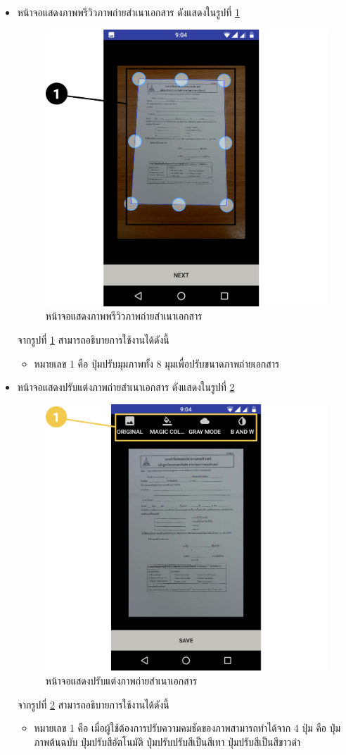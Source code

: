 \begin{enumerate}
\begin{itemize}
			\item หน้าจอแสดงภาพพรีวิวภาพถ่ายสำเนาเอกสาร ดังแสดงในรูปที่ \ref{Fig:submit2}
			\begin{figure}[H]
				\centering
				\includegraphics[width=0.5\columnwidth]{Figures/7/Manual/submit2}
				\caption{หน้าจอแสดงภาพพรีวิวภาพถ่ายสำเนาเอกสาร}
				\label{Fig:submit2}
			\end{figure}
			จากรูปที่ \ref{Fig:submit2} สามารถอธิบายการใช้งานได้ดังนี้
			\begin{itemize}[label={--}]
				\item หมายเลข 1 คือ ปุ่มปรับมุมภาพทั้ง 8 มุมเพื่อปรับขนาดภาพถ่ายเอกสาร
			\end{itemize}
			
			\item หน้าจอแสดงปรับแต่งภาพถ่ายสำเนาเอกสาร ดังแสดงในรูปที่ \ref{Fig:submit3}
			\begin{figure}[H]
				\centering
				\includegraphics[width=0.5\columnwidth]{Figures/7/Manual/submit3}
				\caption{หน้าจอแสดงปรับแต่งภาพถ่ายสำเนาเอกสาร}
				\label{Fig:submit3}
			\end{figure}
			จากรูปที่ \ref{Fig:submit3} สามารถอธิบายการใช้งานได้ดังนี้
			\begin{itemize}[label={--}]
				\item หมายเลข 1 คือ เมื่อผู้ใช้ต้องการปรับความคมชัดของภาพสามารถทำได้จาก 4 ปุ่ม คือ ปุ่มภาพต้นฉบับ ปุ่มปรับสีอัตโนมัติ ปุ่มปรับปรับสีเป็นสีเทา ปุ่มปรับสีเป็นสีขาวดำ
			\end{itemize} 
		

\end{itemize}
\end{enumerate}
